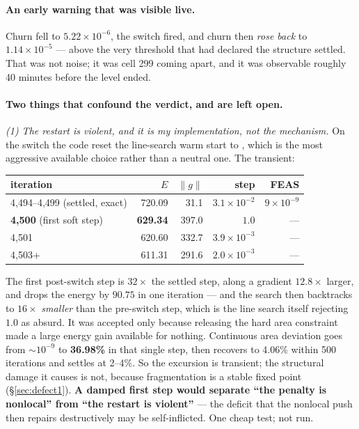 \documentclass[11pt,a4paper]{article}
\begin{document}
\paragraph{An early warning that was visible live.} Churn fell to
\(5.22\times10^{-6}\), the switch fired, and churn then \emph{rose back} to
\(1.14\times10^{-5}\) --- above the very threshold that had declared the
structure settled. That was not noise; it was cell 299 coming apart, and it was
observable roughly 40 minutes before the level ended.

\paragraph{Two things that confound the verdict, and are left open.}

\emph{(1) The restart is violent, and it is my implementation, not the
mechanism.} On the switch the code reset the line-search warm start to
, which is the most aggressive available choice rather than a
neutral one. The transient:

\begin{center}
\begin{tabular}{@{}lrrrr@{}}
\toprule
iteration & \(E\) & \(\|g\|\) & step & FEAS \\
\midrule
4{,}494--4{,}499 (settled, exact) & 720.09 & 31.1 & \(3.1\times10^{-2}\) & \(9\times10^{-9}\) \\
\textbf{4{,}500} (first soft step) & \textbf{629.34} & 397.0 & \(\mathbf{1.0}\) & --- \\
4{,}501 & 620.60 & 332.7 & \(3.9\times10^{-3}\) & --- \\
4{,}503+ & 611.31 & 291.6 & \(2.0\times10^{-3}\) & --- \\
\bottomrule
\end{tabular}
\end{center}

The first post-switch step is \(32\times\) the settled step, along a gradient
\(12.8\times\) larger, and drops the energy by \(90.75\) in one iteration --- and
the search then backtracks to \(16\times\) \emph{smaller} than the pre-switch
step, which is the line search itself rejecting \(1.0\) as absurd. It was
accepted only because releasing the hard area constraint made a large energy gain
available for nothing. Continuous area deviation goes from \(\sim\!10^{-9}\) to
\textbf{36.98\%} in that single step, then recovers to 4.06\% within 500
iterations and settles at 2--4\%. So the excursion is transient; the structural
damage it causes is not, because fragmentation is a stable fixed point
(\S\ref{sec:defect1}). \textbf{A damped first step would separate ``the penalty
is nonlocal'' from ``the restart is violent''} --- the deficit that the nonlocal
push then repairs destructively may be self-inflicted. One cheap test; not run.
\end{document}
